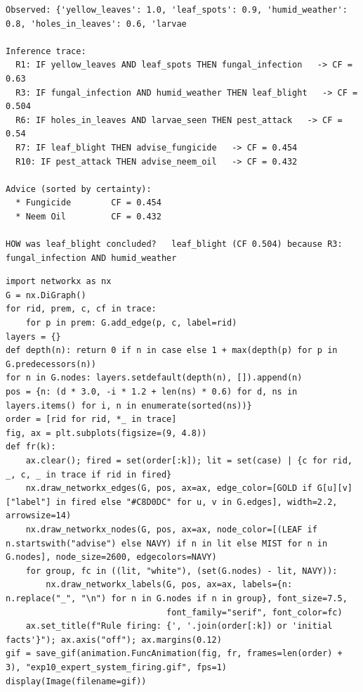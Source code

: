 \documentclass[11pt]{article}
\begin{document}
\begin{lstlisting}[style=out]
Observed: {'yellow_leaves': 1.0, 'leaf_spots': 0.9, 'humid_weather': 0.8, 'holes_in_leaves': 0.6, 'larvae

Inference trace:
  R1: IF yellow_leaves AND leaf_spots THEN fungal_infection   -> CF = 0.63
  R3: IF fungal_infection AND humid_weather THEN leaf_blight   -> CF = 0.504
  R6: IF holes_in_leaves AND larvae_seen THEN pest_attack   -> CF = 0.54
  R7: IF leaf_blight THEN advise_fungicide   -> CF = 0.454
  R10: IF pest_attack THEN advise_neem_oil   -> CF = 0.432

Advice (sorted by certainty):
  * Fungicide        CF = 0.454
  * Neem Oil         CF = 0.432

HOW was leaf_blight concluded?   leaf_blight (CF 0.504) because R3: fungal_infection AND humid_weather
\end{lstlisting}
\begin{lstlisting}[style=py]
import networkx as nx
G = nx.DiGraph()
for rid, prem, c, cf in trace:
    for p in prem: G.add_edge(p, c, label=rid)
layers = {}
def depth(n): return 0 if n in case else 1 + max(depth(p) for p in G.predecessors(n))
for n in G.nodes: layers.setdefault(depth(n), []).append(n)
pos = {n: (d * 3.0, -i * 1.2 + len(ns) * 0.6) for d, ns in layers.items() for i, n in enumerate(sorted(ns))}
order = [rid for rid, *_ in trace]
fig, ax = plt.subplots(figsize=(9, 4.8))
def fr(k):
    ax.clear(); fired = set(order[:k]); lit = set(case) | {c for rid, _, c, _ in trace if rid in fired}
    nx.draw_networkx_edges(G, pos, ax=ax, edge_color=[GOLD if G[u][v]["label"] in fired else "#C8D0DC" for u, v in G.edges], width=2.2, arrowsize=14)
    nx.draw_networkx_nodes(G, pos, ax=ax, node_color=[(LEAF if n.startswith("advise") else NAVY) if n in lit else MIST for n in G.nodes], node_size=2600, edgecolors=NAVY)
    for group, fc in ((lit, "white"), (set(G.nodes) - lit, NAVY)):
        nx.draw_networkx_labels(G, pos, ax=ax, labels={n: n.replace("_", "\n") for n in G.nodes if n in group}, font_size=7.5,
                                font_family="serif", font_color=fc)
    ax.set_title(f"Rule firing: {', '.join(order[:k]) or 'initial facts'}"); ax.axis("off"); ax.margins(0.12)
gif = save_gif(animation.FuncAnimation(fig, fr, frames=len(order) + 3), "exp10_expert_system_firing.gif", fps=1)
display(Image(filename=gif))
\end{lstlisting}
\end{document}
